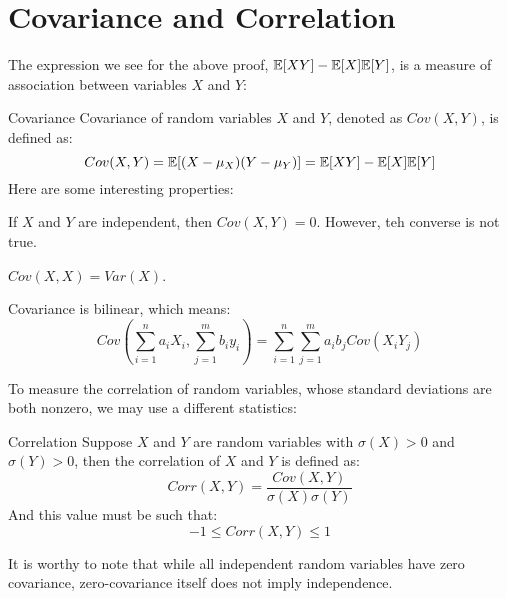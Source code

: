 \section{Covariance and Correlation}
The expression we see for the above proof, $\mathbb{E}[XY] - \mathbb{E}[X]\mathbb{E}[Y]$, is a measure of association between variables $X$ and $Y$:
\begin{ln-define}{Covariance}{}
    Covariance of random variables $X$ and $Y$, denoted as $Cov(X, Y)$, is defined as:
    \[Cov(X, Y) = \mathbb{E}[(X - \mu_X)(Y - \mu_Y)] = \mathbb{E}[XY] - \mathbb{E}[X]\mathbb{E}[Y]\]
    Here are some interesting properties:
    \begin{bindenum}
        \item If $X$ and $Y$ are independent, then $Cov(X, Y) = 0$. However, teh converse is not true.
        \item $Cov(X, X) = Var(X)$.
        \item Covariance is bilinear, which means: \[Cov(\sum_{i = 1}^n a_i X_i, \sum_{j = 1}^m b_i y_i) = \sum_{i = 1}^n \sum_{j = 1}^m a_i b_j Cov(X_i Y_j)\]
    \end{bindenum}
\end{ln-define}
To measure the correlation of random variables, whose standard deviations are both nonzero, we may use a different statistics:
\begin{ln-define}{Correlation}{}
    Suppose $X$ and $Y$ are random variables with $\sigma(X) > 0$ and $\sigma(Y) > 0$, then the correlation of $X$ and $Y$ is defined as:
    \[Corr(X, Y) = \frac{Cov(X, Y)}{\sigma(X) \sigma(Y)}\]
    And this value must be such that:
    \[-1 \leq Corr(X, Y) \leq 1\]
\end{ln-define}
It is worthy to note that while all independent random variables have zero covariance, zero-covariance itself does not imply independence.
